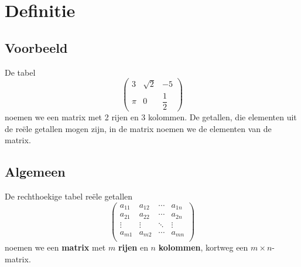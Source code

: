 \documentclass[12pt,twoside]{article}
\begin{document}
\thispagestyle{empty}
\clearpage

{
  \singlespacing
  \tableofcontents
}
\thispagestyle{empty}
\clearpage


\pagestyle{fancy}
\fancyhead[RE,LO]{}

\section{Definitie}

\subsection{Voorbeeld}

De tabel
$$\begin{pmatrix}3 & \sqrt{2} & -5\\ \pi & 0 & \dfrac{1}{2}\end{pmatrix}$$
noemen we een matrix met 2 rijen en 3 kolommen. De getallen, die elementen uit de reële getallen mogen zijn, in de matrix noemen we de elementen van de matrix.

\subsection{Algemeen}

De rechthoekige tabel reële getallen
$$
\begin{pmatrix}
  a_{11} & a_{12} & \cdots & a_{1n} \\
  a_{21} & a_{22} & \cdots & a_{2n} \\
  \vdots      & \vdots      & \ddots & \vdots      \\
  a_{m1} & a_{m2} & \cdots & a_{mn} \\
\end{pmatrix}
$$
noemen we een {\bf matrix} met $m$ {\bf rijen} en $n$ {\bf kolommen}, kortweg een $m \times n$-matrix.
\end{document}
